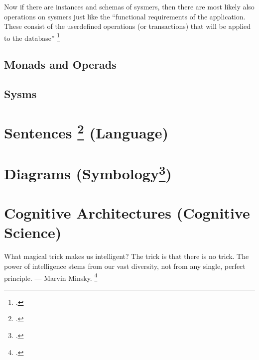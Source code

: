 \documentclass[12pt,a4paper, landscape]{article}
\begin{document}
Now if there are instances and schemas of sysmers, then there are most likely also operations on sysmers just like the ``functional requirements of the application. These consist of the userdefined operations (or transactions) that will be applied to the database'' \footcite[61]{ElmasriNavathe2015}

\subsection{Monads and Operads}

\subsection{Sysms}

\section{Sentences \footcite{Carnie2012} (Language)}

\section{Diagrams (Symbology\footcite{Jung1964})} 

\section{Cognitive Architectures (Cognitive Science)}
What magical trick makes us intelligent? The trick is that there is no trick. The power of intelligence stems from our vast diversity, not from any single, perfect principle. — Marvin Minsky. \footcite[308]{Minsky1988}
\end{document}
